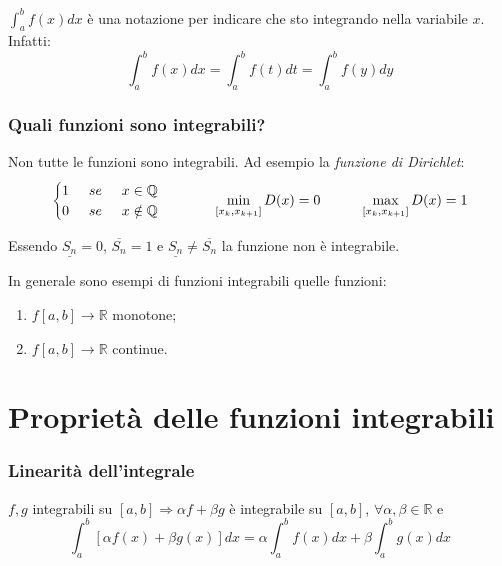 \begin{osservation*}
    $\int_a^bf(x)dx$ è una notazione per indicare che sto integrando nella variabile $x$. Infatti:
    \begin{equation*}\int_a^bf(x)dx=\int_a^bf(t)dt=\int_a^bf(y)dy\end{equation*}
\end{osservation*}

\subsection*{Quali funzioni sono integrabili?}
Non tutte le funzioni sono integrabili. Ad esempio la \textit{funzione di Dirichlet}:
$$\begin{cases}
    1\hspace{0.5cm}se\hspace{0.5cm}x\in\mathbb{Q}\\
    0\hspace{0.5cm}se\hspace{0.5cm}x\notin\mathbb{Q}
\end{cases}\hspace{1cm}\min_{[x_k,x_{k+1}]}D(x)=0\hspace{1cm}\max_{[x_k,x_{k+1}]}D(x)=1$$

Essendo $\underline{S_n}=0$, $\overline{S_n}=1$ e $\underline{S_n}\neq \overline{S_n}$ la funzione non è integrabile.

In generale sono esempi di funzioni integrabili quelle funzioni:
\begin{enumerate}
    \item $f[a,b]\to\mathbb{R}$ monotone;
    \item $f[a,b]\to\mathbb{R}$ continue.
\end{enumerate}


\chapter{Proprietà delle funzioni integrabili}
\subsection*{Linearità dell'integrale}

$f,g$ integrabili su $[a,b]\Rightarrow\alpha f+\beta g$ è integrabile su $[a,b]$, $\forall\alpha,\beta\in\mathbb{R}$ e
\begin{equation*}
    \int^b_a[\alpha f(x)+\beta g(x)]dx=\alpha\int^b_af(x)dx+\beta\int^b_ag(x)dx
\end{equation*}

